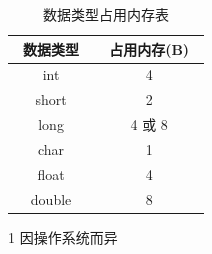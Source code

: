     \begin{table}[htbp]
        \centering
        \renewcommand\arraystretch{1.5}
        \begin{threeparttable}
            \begin{tabular}{|c|c|} 
                \hline
                ~数据类型~    & ~占用内存(B)~   \\
                \hline \hline
                int         & 4             \\
                \hline
                short       & 2             \\
                \hline
                long        & 4 或 8\tnote{1} \\
                \hline
                char        & 1             \\
                \hline
                float       & 4             \\
                \hline
                double      & 8             \\
                \hline
            \end{tabular} 
            \begin{tablenotes}
                \item[1] 因操作系统而异
            \end{tablenotes}
            \caption{数据类型占用内存表} \label{数据类型占用内存表}
        \end{threeparttable}
    \end{table} 

